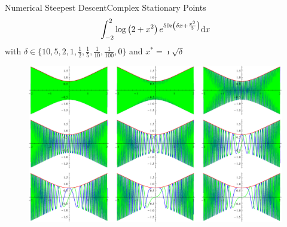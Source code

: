 \documentclass{beamer}
\begin{document}
\begin{frame}{Numerical Steepest Descent}{Complex Stationary Points}
  \vspace{-0.5cm}
  \begin{equation*}
    \int_{-2}^{2} \log\left(2+x^2\right) e^{50 \imath \left(\delta x + \frac{x^3}{3}\right)} \mathrm{d}x
  \end{equation*}
  with $\delta \in \{10, 5, 2, 1, \frac{1}{2}, \frac{1}{5}, \frac{1}{10}, \frac{1}{100}, 0\}$
  and $x^{*} = \imath \sqrt{\delta}$
  \begin{figure}
    \centering
    \includegraphics[width=0.7\linewidth]{./fig/oscillatory_integral_complex_sp.pdf}
  \end{figure}
\end{frame}
\end{document}
